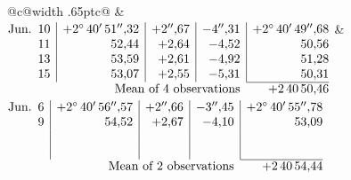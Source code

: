 \noindent\begin{tabular}{@{}c@{\hspace{.4em}\vrule width .65pt\hspace{.4em}}c@{}}
 &
 \\[.18ex]
\(\begin{array}[t]{@{}r|r|r|r|r@{}}
\text{Jun.}\enspace 10 & +2^\circ\,40'\,51''{,}32 & +2''{,}67 & -4''{,}31 & +2^\circ\,40'\,49''{,}68\\
11 & 52{,}44 & +2{,}64 & -4{,}52 & 50{,}56\\
13 & 53{,}59 & +2{,}61 & -4{,}92 & 51{,}28\\
15 & 53{,}07 & +2{,}55 & -5{,}31 & 50{,}31\\
\cline{5-5}
\multicolumn{4}{r}{\text{Mean of 4 observations}} & +2\,40\,50{,}46
\end{array}\)
&
\(\begin{array}[t]{@{}r|r|r|r|r@{}}
\text{Jun.}\enspace 6 & +2^\circ\,40'\,56''{,}57 & +2''{,}66 & -3''{,}45 & +2^\circ\,40'\,55''{,}78\\
9 & 54{,}52 & +2{,}67 & -4{,}10 & 53{,}09\\
 & & & & \\
 & & & & \\
\cline{5-5}
\multicolumn{4}{r}{\text{Mean of 2 observations}} & +2\,40\,54{,}44
\end{array}\)
\end{tabular}\par\medskip
{}
